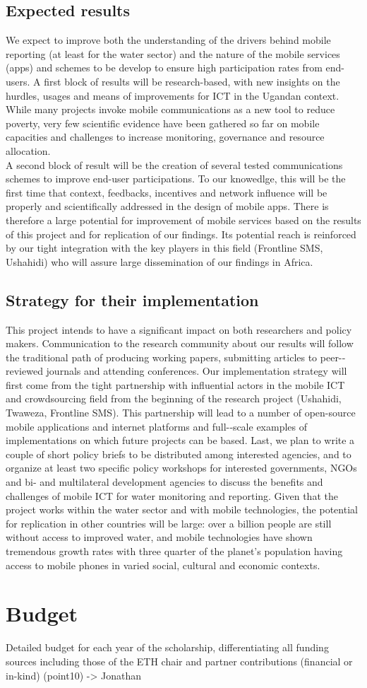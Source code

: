 \documentclass[11pt]{article}
\begin{document}
\subsection{Expected results}
We expect to improve both the understanding of the drivers behind mobile reporting (at least for the water sector) and the nature of the mobile services (apps) and schemes to be develop to ensure high participation rates from end-users. A first block of results will be research-based, with new insights on the hurdles, usages and means of improvements for ICT in the Ugandan context. While many projects invoke mobile communications as a new tool to reduce poverty, very few scientific evidence have been gathered so far on mobile capacities and challenges to increase monitoring, governance and resource allocation. 
\\
A second block of result will be the creation of several tested communications schemes to improve end-user participations. To our knowedlge, this will be the first time that context, feedbacks, incentives and network influence will be properly and scientifically addressed in the design of mobile apps. There is therefore a large potential for improvement of mobile services based on the results of this project and for replication of our findings. Its potential reach is reinforced by our tight integration with the key players in this field (Frontline SMS, Ushahidi) who will assure large dissemination of our findings in Africa.
\subsection{Strategy for their implementation}
This project intends to have a significant impact on both researchers and policy makers. Communication to the research community about our results will follow the traditional path of producing working papers, submitting articles to peer-­reviewed journals and attending conferences. Our implementation strategy will first come from the tight partnership with influential actors in the mobile ICT and crowdsourcing field from the beginning of the research project (Ushahidi, Twaweza, Frontline SMS). This partnership will lead to a number of open-­source mobile applications and internet platforms and full-­‐scale examples of implementations on which future projects can be based. Last, we plan to write a couple of short policy briefs to be distributed among interested agencies, and to organize at least two specific policy workshops for interested governments, NGOs and bi-­ and multilateral development agencies to discuss the benefits and challenges of mobile ICT for water monitoring and reporting. Given that the project works within the water sector and with mobile technologies, the potential for replication in other countries will be large: over a billion people are still without access to improved water, and mobile technologies have shown tremendous growth rates with three quarter of the planet’s population having access to mobile phones in varied social, cultural and economic contexts.

\section{Budget}

Detailed budget for each year of the scholarship, differentiating all funding sources including those of the ETH chair and partner contributions (financial or in-kind) (point10) -> Jonathan




\end{document}
